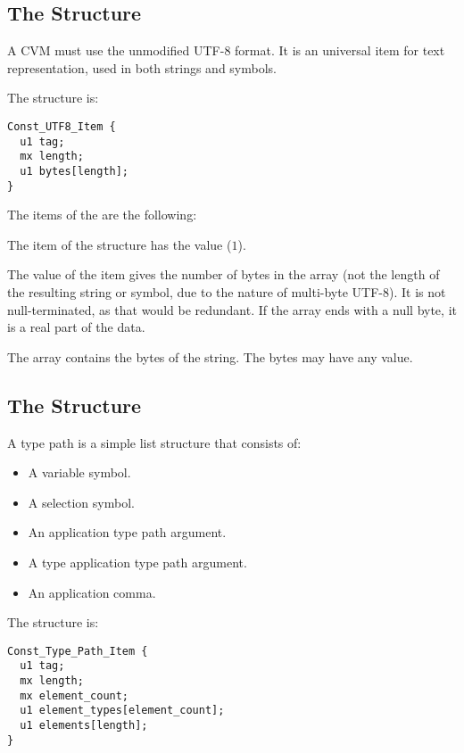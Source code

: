 \subsection{The  Structure}

A CVM must use the unmodified UTF-8 format. It is an universal item for text representation, used in both strings and symbols. 

The  structure is:
\begin{lstlisting}
Const_UTF8_Item {
  u1 tag;
  mx length;
  u1 bytes[length];
}
\end{lstlisting}

The items of the  are the following:
\begin{description}[font=\ttfamily\mdseries,style=nextline]
  \item[tag]
  The  item of the  structure has the value  ($1$). 
  \item[length]
  The value of the  item gives the number of bytes in the  array (not the length of the resulting string or symbol, due to the nature of multi-byte \mbox{UTF-8}). It is not null-terminated, as that would be redundant. If the array ends with a null byte, it is a real part of the data. 
  \item[bytes]
  The  array contains the bytes of the string. The bytes may have any value. 
\end{description}





\subsection{The  Structure}

A type path is a simple list structure that consists of: 
\begin{itemize}
  \item A variable symbol. 
  \item A selection symbol. 
  \item An application type path argument. 
  \item A type application type path argument. 
  \item An application comma.
\end{itemize}

The  structure is:
\begin{lstlisting}
Const_Type_Path_Item {
  u1 tag;
  mx length;
  mx element_count;
  u1 element_types[element_count];
  u1 elements[length];
}
\end{lstlisting}

